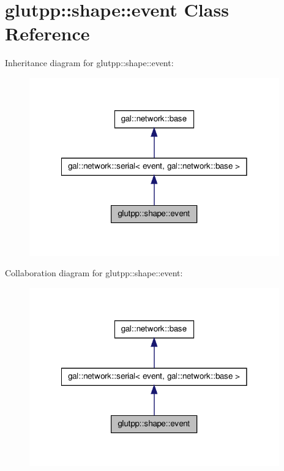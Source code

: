 \hypertarget{classglutpp_1_1shape_1_1event}{\section{glutpp\-:\-:shape\-:\-:event \-Class \-Reference}
\label{classglutpp_1_1shape_1_1event}
}


\-Inheritance diagram for glutpp\-:\-:shape\-:\-:event\-:\nopagebreak
\begin{figure}[H]
\begin{center}
\leavevmode
\includegraphics[width=306pt]{classglutpp_1_1shape_1_1event__inherit__graph}
\end{center}
\end{figure}


\-Collaboration diagram for glutpp\-:\-:shape\-:\-:event\-:\nopagebreak
\begin{figure}[H]
\begin{center}
\leavevmode
\includegraphics[width=306pt]{classglutpp_1_1shape_1_1event__coll__graph}
\end{center}
\end{figure}
